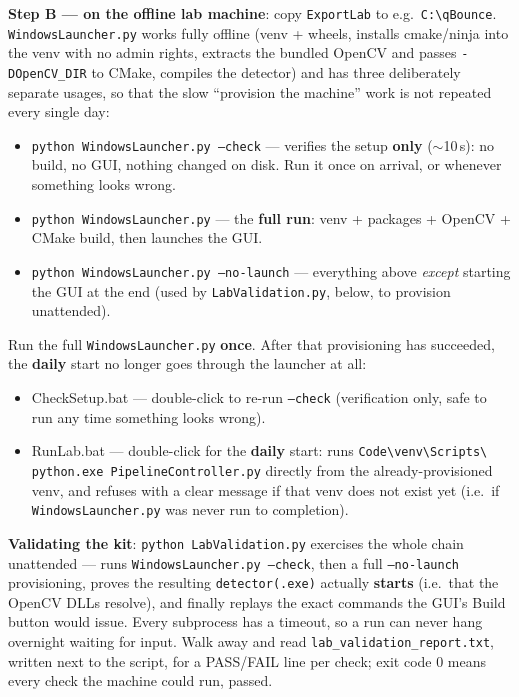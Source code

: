 \documentclass[11pt,a4paper]{article}
\newcommand{\gui}[1]{\textsf{#1}}
\begin{document}
\textbf{Step B — on the offline lab machine}: copy \texttt{ExportLab} to
e.g.\ \texttt{C:\textbackslash qBounce}. \texttt{WindowsLauncher.py} works
fully offline (venv + wheels, installs cmake/ninja into the venv with no
admin rights, extracts the bundled OpenCV and passes
\texttt{-DOpenCV\_DIR} to CMake, compiles the detector) and has three
deliberately separate usages, so that the slow ``provision the machine''
work is not repeated every single day:
\begin{itemize}
  \item \texttt{python WindowsLauncher.py --check} --- verifies the setup
        \textbf{only} ($\sim$10\,s): no build, no GUI, nothing changed on
        disk. Run it once on arrival, or whenever something looks wrong.
  \item \texttt{python WindowsLauncher.py} --- the \textbf{full run}: venv +
        packages + OpenCV + CMake build, then launches the GUI.
  \item \texttt{python WindowsLauncher.py --no-launch} --- everything above
        \emph{except} starting the GUI at the end (used by
        \texttt{LabValidation.py}, below, to provision unattended).
\end{itemize}
Run the full \texttt{WindowsLauncher.py} \textbf{once}. After that
provisioning has succeeded, the \textbf{daily} start no longer goes through
the launcher at all:
\begin{itemize}
  \item \gui{CheckSetup.bat} --- double-click to re-run \texttt{--check}
        (verification only, safe to run any time something looks wrong).
  \item \gui{RunLab.bat} --- double-click for the \textbf{daily} start: runs
        \texttt{Code\textbackslash venv\textbackslash Scripts\textbackslash
        python.exe PipelineController.py} directly from the
        already-provisioned venv, and refuses with a clear message if that
        venv does not exist yet (i.e.\ if \texttt{WindowsLauncher.py} was
        never run to completion).
\end{itemize}

\textbf{Validating the kit}: \texttt{python LabValidation.py} exercises the
whole chain unattended --- runs \texttt{WindowsLauncher.py --check}, then a
full \texttt{--no-launch} provisioning, proves the resulting
\texttt{detector(.exe)} actually \textbf{starts} (i.e.\ that the OpenCV DLLs
resolve), and finally replays the exact commands the GUI's \gui{Build}
button would issue. Every subprocess has a timeout, so a run can never hang
overnight waiting for input. Walk away and read
\texttt{lab\_validation\_report.txt}, written next to the script, for a
PASS/FAIL line per check; exit code 0 means every check the machine could
run, passed.
\end{document}
